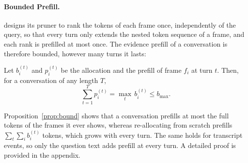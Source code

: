 \paragraph{Bounded Prefill.}
\name designs its pruner to rank the tokens of each frame once, independently of the query, so that every turn only extends the nested token sequence of a frame, and each rank is prefilled at most once. The evidence prefill of a conversation is therefore bounded, however many turns it lasts:

\begin{proposition}
\label{prop:bound}
Let $b_i^{(t)}$ and $p_i^{(t)}$ be the allocation and the prefill of frame $f_i$ at turn $t$. Then, for a conversation of any length $T$,
\begin{equation}
  \sum_{t=1}^{T}p_i^{(t)}=\max_t\,b_i^{(t)}\le b_{\max} .
\end{equation}
\end{proposition}

\noindent Proposition~\ref{prop:bound} shows that a conversation prefills at most the full tokens of the frames it ever shows, whereas re-allocating from scratch prefills $\sum_t\sum_ib_i^{(t)}$ tokens, which grows with every turn. The same holds for transcript events, so only the question text adds prefill at every turn. A detailed proof is provided in the appendix.
